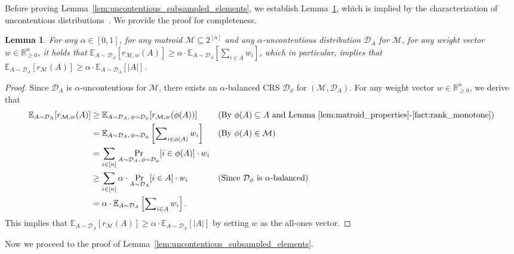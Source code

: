 \documentclass[11pt]{article}
\newcommand{\D}{\mathcal D}
\def \E {\mathbb{E}}
\newcommand{\M}{{\mathcal M}}
\newcommand{\R}{{\mathbb R}}
\newtheorem{lemma}[theorem]{Lemma}
\begin{document}
Before proving Lemma~\ref{lem:uncontentious_subsampled_elements}, we establish Lemma~\ref{lem:rank_of_uncontentious_active_set}, which is implied by the characterization of uncontentious distributions~\citep[Theorem 2.1]{dughmi2020outer}. We provide the proof for completeness.
\begin{lemma}\label{lem:rank_of_uncontentious_active_set}
For any $\alpha\in [0,1]$, for any matroid $\M\subseteq 2^{[n]}$ and any $\alpha$-uncontentious distribution $\D_A$ for $\M$, for any weight vector $w\in\R_{\ge0}^n$, it holds that
$\E_{A\sim\D_A}[r_{\M,w}(A)]\ge\alpha\cdot\E_{A\sim\D_A}[\sum_{i\in A}w_i]$, which in particular, implies that $\E_{A\sim\D_A}[r_{\M}(A)]\ge\alpha\cdot\E_{A\sim\D_A}[|A|]$.
\end{lemma}
\begin{proof}
Since $\D_A$ is $\alpha$-uncontentious for $\M$, there exists an $\alpha$-balanced CRS $\D_{\phi}$ for $(\M,\D_A)$. For any weight vector $w\in\R_{\ge0}^n$, we derive that
\begin{align*}
    \E_{A\sim\D_A}[r_{\M,w}(A)]&\ge\E_{A\sim\D_A,\,\phi\sim\D_{\phi}}[r_{\M,w}(\phi(A))] &&\text{(By $\phi(A)\subseteq A$ and Lemma~\ref{lem:matroid_properties}-\ref{fact:rank_monotone})}\\
    &=\E_{A\sim\D_A,\,\phi\sim\D_{\phi}}\left[\sum\nolimits_{i\in\phi(A)}w_i\right] &&\text{(By $\phi(A)\in\M$)}\\
    &=\sum_{i\in[n]} \Pr_{A\sim\D_A,\,\phi\sim\D_{\phi}}[i\in \phi(A)]\cdot w_i\\
    &\ge\sum_{i\in[n]}\alpha\cdot\Pr_{A\sim\D_A}[i\in A]\cdot w_i &&\text{(Since $\D_{\phi}$ is $\alpha$-balanced)}\\
    &=\alpha\cdot\E_{A\sim\D_A}\left[\sum\nolimits_{i\in A} w_i\right].
\end{align*}
This implies that $\E_{A\sim\D_A}[r_{\M}(A)]\ge\alpha\cdot\E_{A\sim\D_A}[|A|]$ by setting $w$ as the all-ones vector.
\end{proof}
Now we proceed to the proof of Lemma~\ref{lem:uncontentious_subsampled_elements}.
\end{document}
